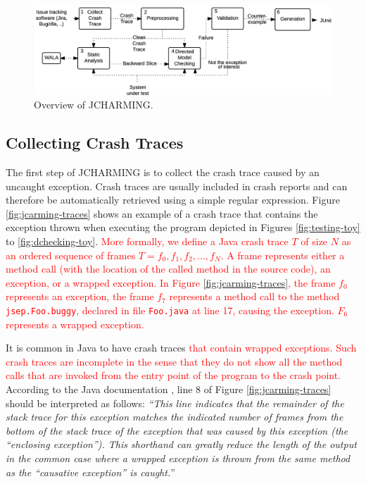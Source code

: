 \documentclass[times, doublespace]{smrauth}
\newcommand{\red}[1]{\textcolor{red}{#1}}
\begin{document}
\begin{figure}
  \centering
    \includegraphics[scale=0.8]{media/jcharming-approach.png}
    \caption{Overview of JCHARMING.
    \label{fig:jcarming-approach}}
\end{figure}

\subsection{Collecting Crash Traces}

The first step of JCHARMING is to collect the crash trace
caused by an uncaught exception. Crash traces are usually included in crash reports and can therefore be automatically
retrieved using a simple regular expression.
Figure \ref{fig:jcarming-traces} shows an example of a crash trace that contains the
exception thrown when executing the program depicted in
Figures \ref{fig:testing-toy} to \ref{fig:dchecking-toy}.
\red{More formally, we define a Java crash trace $T$ of size $N$ as an ordered sequence of frames $T={f_0, f_1, f_2, ..., f_N}$. A frame represents either a method call (with the location of the called method in the source code), an exception, or a wrapped exception.
In Figure \ref{fig:jcarming-traces}, the frame $f_0$ represents an exception, the frame  $f_7$ represents a method call to the method \texttt{jsep.Foo.buggy}, declared in file \texttt{Foo.java} at  line 17, causing the exception. $F_6$ represents a wrapped exception.}

It is common in Java to have crash
traces \red{that contain wrapped exceptions.
Such crash traces are incomplete in the sense that they do not show all the method calls that are invoked from the entry point of the program to the crash point.}
According to the Java documentation \cite{Oracle2011}, line 8 of
Figure \ref{fig:jcarming-traces} should be interpreted as follows: {\it ``This line indicates
that the remainder of the stack trace for this exception
matches the indicated number of frames from the bottom of the
stack trace of the exception that was caused by this exception
(the ``enclosing exception''). This shorthand can greatly
reduce the length of the output in the common case where a
wrapped exception is thrown from the same method as the
``causative exception'' is caught.}''
\end{document}
